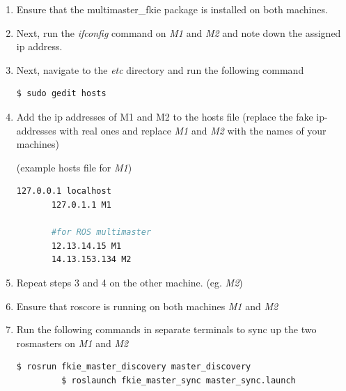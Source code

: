 \documentclass[11pt]{article}
\begin{document}
\begin{enumerate}
 \item {
       Ensure that the multimaster\_fkie package is installed on both machines.
       }
 \item{
       Next, run the \emph{ifconfig} command on \emph{M1} and \emph{M2} and note down the  assigned ip address.
       }
 \item{
       Next, navigate to the \emph{etc} directory and run the following command
       \begin{lstlisting}[language=bash]
        $ sudo gedit hosts
        \end{lstlisting}
       }
 \item{
       Add the ip addresses of M1 and M2 to the hosts file (replace the fake ip-addresses with real ones and replace \emph{M1} and \emph{M2} with the names of your machines)
       
       (example hosts file for \emph{M1})
       \begin{lstlisting}[language=bash]
       127.0.0.1 localhost
       127.0.1.1 M1

       #for ROS multimaster
       12.13.14.15 M1
       14.13.153.134 M2
        \end{lstlisting}
       }
 \item{
       Repeat steps 3 and 4 on  the other machine. (eg. \emph{M2})
       }
 \item{
       Ensure that roscore is running on both machines \emph{M1} and \emph{M2}
       }
 \item{
       Run the following commands in separate terminals to sync up the two rosmasters on \emph{M1} and \emph{M2}
       \begin{lstlisting}[language=bash]
         $ rosrun fkie_master_discovery master_discovery
         $ roslaunch fkie_master_sync master_sync.launch
        \end{lstlisting}
       
       }
\end{enumerate}
\end{document}
